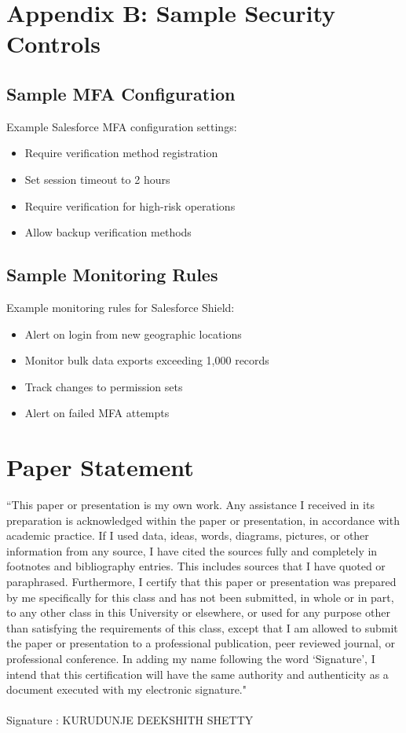 \documentclass[12pt,a4paper]{article}
\begin{document}
\section{Appendix B: Sample Security Controls}
\subsection{Sample MFA Configuration}
Example Salesforce MFA configuration settings:
\begin{itemize}
    \item Require verification method registration
    \item Set session timeout to 2 hours
    \item Require verification for high-risk operations
    \item Allow backup verification methods
\end{itemize}

\subsection{Sample Monitoring Rules}
Example monitoring rules for Salesforce Shield:
\begin{itemize}
    \item Alert on login from new geographic locations
    \item Monitor bulk data exports exceeding 1,000 records
    \item Track changes to permission sets
    \item Alert on failed MFA attempts
\end{itemize}




\section{Paper Statement}

“This paper or presentation is my own work. Any assistance I received in its preparation is acknowledged within the paper or presentation, in accordance with academic practice. If I used data, ideas, words, diagrams, pictures, or other information from any source, I have cited the sources fully and completely in footnotes and bibliography entries. This includes sources that I have quoted or paraphrased. Furthermore, I certify that this paper or presentation was prepared by me specifically for this class and has not been submitted, in whole or in part, to any other class in this University or elsewhere, or used for any purpose other than satisfying the requirements of this class, except that I am allowed to submit the paper or presentation to a professional publication, peer reviewed journal, or professional conference. In adding my name following the word ‘Signature’, I intend that this certification will have the same authority and authenticity as a document executed with my electronic signature."
\\\\
Signature : KURUDUNJE DEEKSHITH SHETTY
\end{document}
